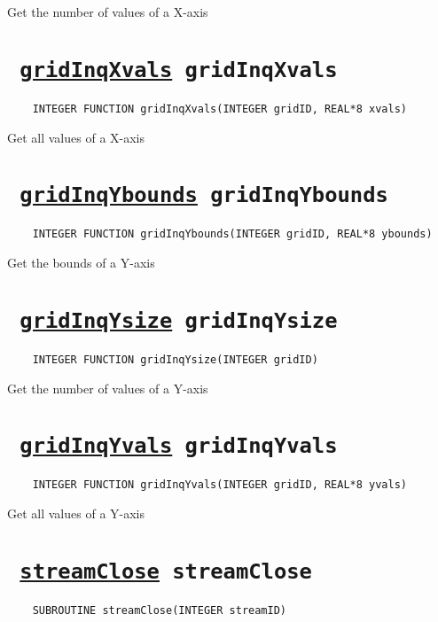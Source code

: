 Get the number of values of a X-axis
\ifpdfoutput{}{(\ref{gridInqXsize})}


\section*{\texttt{ 
\ifpdf
\hyperref[gridInqXvals]{gridInqXvals}
\else
gridInqXvals
\fi
}}
\begin{verbatim}
    INTEGER FUNCTION gridInqXvals(INTEGER gridID, REAL*8 xvals)
\end{verbatim}

Get all values of a X-axis
\ifpdfoutput{}{(\ref{gridInqXvals})}


\section*{\texttt{ 
\ifpdf
\hyperref[gridInqYbounds]{gridInqYbounds}
\else
gridInqYbounds
\fi
}}
\begin{verbatim}
    INTEGER FUNCTION gridInqYbounds(INTEGER gridID, REAL*8 ybounds)
\end{verbatim}

Get the bounds of a Y-axis
\ifpdfoutput{}{(\ref{gridInqYbounds})}


\section*{\texttt{ 
\ifpdf
\hyperref[gridInqYsize]{gridInqYsize}
\else
gridInqYsize
\fi
}}
\begin{verbatim}
    INTEGER FUNCTION gridInqYsize(INTEGER gridID)
\end{verbatim}

Get the number of values of a Y-axis
\ifpdfoutput{}{(\ref{gridInqYsize})}


\section*{\texttt{ 
\ifpdf
\hyperref[gridInqYvals]{gridInqYvals}
\else
gridInqYvals
\fi
}}
\begin{verbatim}
    INTEGER FUNCTION gridInqYvals(INTEGER gridID, REAL*8 yvals)
\end{verbatim}

Get all values of a Y-axis
\ifpdfoutput{}{(\ref{gridInqYvals})}


\section*{\texttt{ 
\ifpdf
\hyperref[streamClose]{streamClose}
\else
streamClose
\fi
}}
\begin{verbatim}
    SUBROUTINE streamClose(INTEGER streamID)
\end{verbatim}

